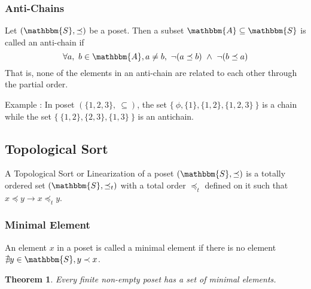 \documentclass[14pt]{extarticle}
\newcommand{\impl}{\xrightarrow{}}
\newcommand{\A}{\mathbbm{A}}
\newcommand{\Sset}{\mathbbm{S}}
\newcommand{\pordereq}{\preceq}
\newcommand{\porder}{\prec}
\newtheorem{theorem}{Theorem}
\begin{document}
\subsubsection{Anti-Chains}

Let $(\Sset, \pordereq)$ be a poset. Then a subset $\A \subseteq \Sset$ is called an anti-chain if
\[
    \forall a, \ b \in \A, a\neq b,  \ \neg (a \pordereq b) \ \land \ \neg (b \pordereq a)
\]
That is, none of the elements in an anti-chain are related to each other through the partial order.

Example : In poset $(\{1, 2, 3\}, \ \subseteq)$, the set $\{ \ \phi, \{1\}, \{1, 2\}, \{1, 2, 3\} \ \}$ is a chain while the set $\{ \ \{1, 2\}, \{2, 3\}, \{1, 3\} \ \}$ is an antichain.

\subsection{Topological Sort}

A Topological Sort or Linearization of a poset $(\Sset, \pordereq)$ is a totally ordered set $(\Sset, \pordereq_t)$ with a total order $\pordereq_t$ defined on it such that $x \pordereq y \impl x \pordereq_t y$.

\subsubsection{Minimal Element}

An element $x$ in a poset is called a minimal element if there is no element $\nexists y \in \Sset, y \porder x$.

\begin{theorem}
    Every finite non-empty poset has a set of minimal elements.
\end{theorem}
\end{document}

